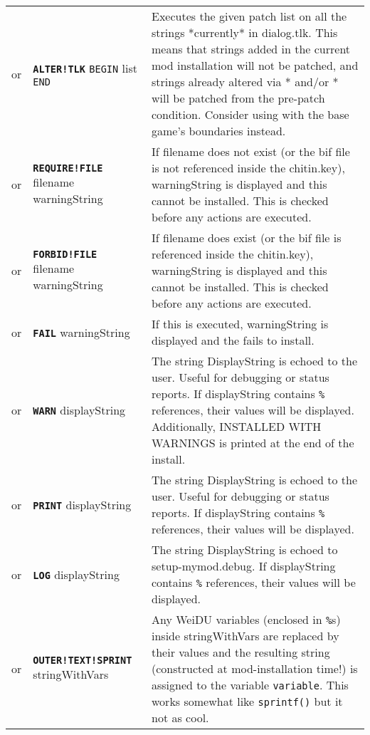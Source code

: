 \documentclass{article}
\def\ttref#1{\ahrefloc{#1}{\tt #1}}
\def\DEFINE#1{{\tt \bf #1}\label{#1}\index{#1}}
\def\t#1{{\tt #1}}
\def\Slist{{\color{red} list }}
\begin{document}
\begin{tabular}{cp{10in}|p{10in}}
	or & \DEFINE{ALTER!TLK} \t{BEGIN} \ttref{patch} \Slist \t{END} &
		Executes the given patch list on all the strings *currently* in dialog.tlk.
		This means that strings added in the current mod installation will not
		be patched, and strings already altered via \ttref{ALTER!TLK}* and/or \ttref{STRING!SET}*
		will be patched from the pre-patch condition. Consider using
		\ttref{ALTER!TLK!RANGE} with the base game's boundaries instead. \\

  or & \DEFINE{REQUIRE!FILE} filename warningString &
    If filename does not exist (or the bif file is not referenced inside
    the chitin.key), warningString is displayed and this
    \ttref{component} cannot be installed. This is checked before any
    actions are executed. \\
  or & \DEFINE{FORBID!FILE} filename warningString &
    If filename does exist (or the bif file is referenced inside
    the chitin.key), warningString is displayed and this
    \ttref{component} cannot be installed. This is checked before any
    actions are executed. \\
  or & \DEFINE{FAIL} warningString &
    If this \ttref{TP2 Action} is executed, warningString is displayed and
    the \ttref{component} fails to install. \\
  or & \DEFINE{WARN} displayString &
    The string DisplayString is echoed to the user. Useful for debugging or
    status reports. If displayString contains \t{\%}\ttref{variable}\t{\%}
    references, their values will be displayed. Additionally, INSTALLED WITH
    WARNINGS is printed at the end of the install.
    \\
  or & \DEFINE{PRINT} displayString &
    The string DisplayString is echoed to the user. Useful for debugging or
    status reports. If displayString contains \t{\%}\ttref{variable}\t{\%}
    references, their values will be displayed. \\
  or & \DEFINE{LOG} displayString &
    The string DisplayString is echoed to setup-mymod.debug.
    If displayString contains \t{\%}\ttref{variable}\t{\%}
    references, their values will be displayed. \\
or & \DEFINE{OUTER!TEXT!SPRINT} \ttref{variable} stringWithVars &
  Any WeiDU variables (enclosed in \t{\%}s) inside stringWithVars are
  replaced by their values and the resulting string (constructed at
  mod-installation time!) is assigned to the variable \t{variable}.
  This works somewhat like \t{sprintf()} but it not as cool. \\

\end{tabular}
\end{document}
